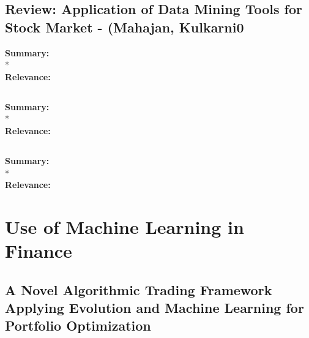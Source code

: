 \documentclass[11pt]{article}
\begin{document}
\subsection{\textnormal{Review: Application of Data Mining Tools for Stock Market - (Mahajan, Kulkarni0}} 

\textbf{Summary: } 
\\*
\\
\textbf{Relevance: } 

\subsection{\textnormal{}} 

\textbf{Summary: } 
\\*
\\
\textbf{Relevance: } 

\subsection{\textnormal{}} 

\textbf{Summary: } 
\\*
\\
\textbf{Relevance: } 



 
 
 
 
 
 


\pagebreak

\section{Use of Machine Learning in Finance}

\subsection{\textnormal{A Novel Algorithmic Trading Framework Applying Evolution and Machine Learning
for Portfolio Optimization}}
\end{document}
